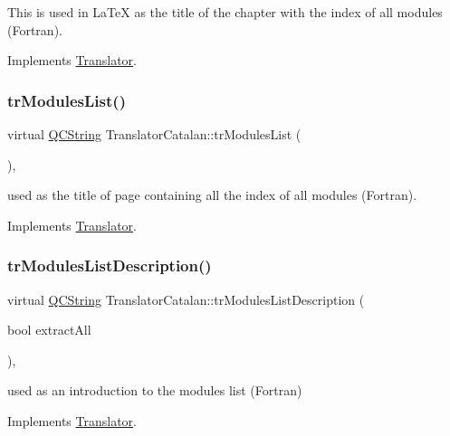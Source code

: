 This is used in La\+TeX as the title of the chapter with the index of all modules (Fortran). 

Implements \mbox{\hyperlink{class_translator}{Translator}}.

\mbox{\label{class_translator_catalan_a718757ca4fd0988b2c422e9d55b2a14f}} 
\subsubsection{\texorpdfstring{trModulesList()}{trModulesList()}}
{\footnotesize\ttfamily virtual \mbox{\hyperlink{class_q_c_string}{Q\+C\+String}} Translator\+Catalan\+::tr\+Modules\+List (\begin{DoxyParamCaption}{ }\end{DoxyParamCaption})\hspace{0.3cm}{\ttfamily [inline]}, {\ttfamily [virtual]}}

used as the title of page containing all the index of all modules (Fortran). 

Implements \mbox{\hyperlink{class_translator}{Translator}}.

\mbox{\label{class_translator_catalan_a83b15ec30866d498442f65595bf03faa}} 
\subsubsection{\texorpdfstring{trModulesListDescription()}{trModulesListDescription()}}
{\footnotesize\ttfamily virtual \mbox{\hyperlink{class_q_c_string}{Q\+C\+String}} Translator\+Catalan\+::tr\+Modules\+List\+Description (\begin{DoxyParamCaption}\item[{bool}]{extract\+All }\end{DoxyParamCaption})\hspace{0.3cm}{\ttfamily [inline]}, {\ttfamily [virtual]}}

used as an introduction to the modules list (Fortran) 

Implements \mbox{\hyperlink{class_translator}{Translator}}.

